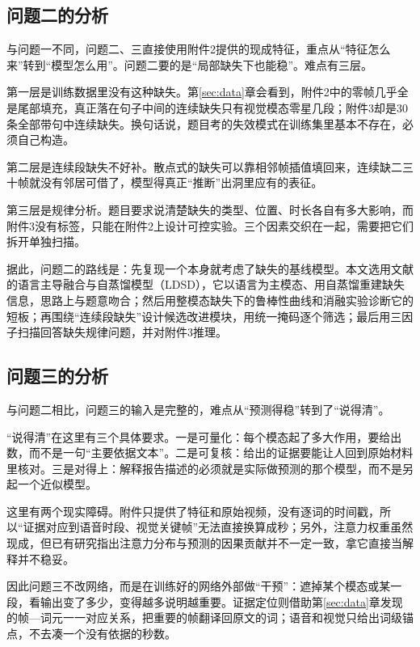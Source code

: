 \subsection{问题二的分析}

与问题一不同，问题二、三直接使用附件2提供的现成特征，重点从“特征怎么来”转到“模型怎么用”。问题二要的是“局部缺失下也能稳”。难点有三层。

第一层是训练数据里没有这种缺失。第\ref{sec:data}章会看到，附件2中的零帧几乎全是尾部填充，真正落在句子中间的连续缺失只有视觉模态零星几段；附件3却是30条全部带句中连续缺失。换句话说，题目考的失效模式在训练集里基本不存在，必须自己构造。

第二层是连续段缺失不好补。散点式的缺失可以靠相邻帧插值填回来，连续缺二三十帧就没有邻居可借了，模型得真正“推断”出洞里应有的表征。

第三层是规律分析。题目要求说清楚缺失的类型、位置、时长各自有多大影响，而附件3没有标签，只能在附件2上设计可控实验。三个因素交织在一起，需要把它们拆开单独扫描。

据此，问题二的路线是：先复现一个本身就考虑了缺失的基线模型。本文选用文献\cite{shi2026ldsd}的语言主导融合与自蒸馏模型（LDSD），它以语言为主模态、用自蒸馏重建缺失信息，思路上与题意吻合；然后用整模态缺失下的鲁棒性曲线和消融实验诊断它的短板；再围绕“连续段缺失”设计候选改进模块，用统一掩码逐个筛选；最后用三因子扫描回答缺失规律问题，并对附件3推理。

\subsection{问题三的分析}

与问题二相比，问题三的输入是完整的，难点从“预测得稳”转到了“说得清”。

“说得清”在这里有三个具体要求。一是可量化：每个模态起了多大作用，要给出数，而不是一句“主要依据文本”。二是可复核：给出的证据要能让人回到原始材料里核对。三是对得上：解释报告描述的必须就是实际做预测的那个模型，而不是另起一个近似模型。

这里有两个现实障碍。附件只提供了特征和原始视频，没有逐词的时间戳，所以“证据对应到语音时段、视觉关键帧”无法直接换算成秒；另外，注意力权重虽然现成，但已有研究\cite{jain2019attention}指出注意力分布与预测的因果贡献并不一定一致，拿它直接当解释并不稳妥。

因此问题三不改网络，而是在训练好的网络外部做“干预”：遮掉某个模态或某一段，看输出变了多少，变得越多说明越重要。证据定位则借助第\ref{sec:data}章发现的帧—词元一一对应关系，把重要的帧翻译回原文的词；语音和视觉只给出词级锚点，不去凑一个没有依据的秒数。


